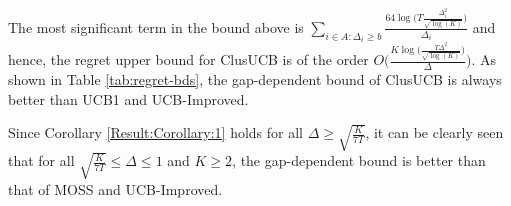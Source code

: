 
The most significant term in the bound above is $\sum_{i\in A:\Delta_{i}\geq b}\frac{64\log{\big(T\frac{\Delta_{i}^{2}}{\sqrt{\log (K)}}\big)}}{\Delta_{i}}$ and hence, the regret upper bound for ClusUCB is of the order $O\bigg(\frac{K\log \big(\frac{T\Delta^{2}}{\sqrt{\log (K)}}\big)}{\Delta}\bigg)$. As shown in Table \ref{tab:regret-bds}, the gap-dependent bound of ClusUCB is always better than UCB1 and UCB-Improved. 


Since Corollary \ref{Result:Corollary:1} holds for all $\Delta \geq \sqrt{\frac{K}{7 T}} $, it can be clearly seen that for all $\sqrt{\frac{K}{7 T}} \leq \Delta\leq 1$ and $K\geq 2$, the gap-dependent bound is better than that of MOSS and UCB-Improved. 





